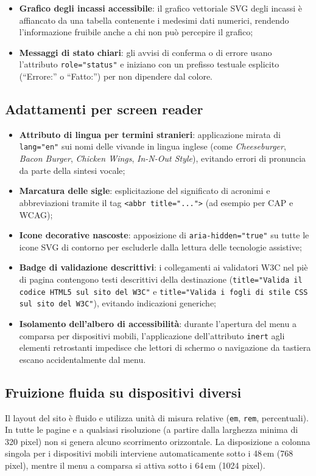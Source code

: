 \documentclass[a4paper,11pt]{article}
\begin{document}
\begin{itemize}
    \item \textbf{Grafico degli incassi accessibile}: il grafico vettoriale SVG degli incassi è affiancato da una tabella contenente i medesimi dati numerici, rendendo l'informazione fruibile anche a chi non può percepire il grafico;
    \item \textbf{Messaggi di stato chiari}: gli avvisi di conferma o di errore usano l'attributo \texttt{role="status"} e iniziano con un prefisso testuale esplicito (``Errore:'' o ``Fatto:'') per non dipendere dal colore.
\end{itemize}

\subsection{Adattamenti per screen reader}
\begin{itemize}
    \item \textbf{Attributo di lingua per termini stranieri}: applicazione mirata di \texttt{lang="en"} sui nomi delle vivande in lingua inglese (come \textit{Cheeseburger}, \textit{Bacon Burger}, \textit{Chicken Wings}, \textit{In-N-Out Style}), evitando errori di pronuncia da parte della sintesi vocale;
    \item \textbf{Marcatura delle sigle}: esplicitazione del significato di acronimi e abbreviazioni tramite il tag \texttt{<abbr title="...">} (ad esempio per CAP e WCAG);
    \item \textbf{Icone decorative nascoste}: apposizione di \texttt{aria-hidden="true"} su tutte le icone SVG di contorno per escluderle dalla lettura delle tecnologie assistive;
    \item \textbf{Badge di validazione descrittivi}: i collegamenti ai validatori W3C nel piè di pagina contengono testi descrittivi della destinazione (\texttt{title="Valida il codice HTML5 sul sito del W3C"} e \texttt{title="Valida i fogli di stile CSS sul sito del W3C"}), evitando indicazioni generiche;
    \item \textbf{Isolamento dell'albero di accessibilità}: durante l'apertura del menu a comparsa per dispositivi mobili, l'applicazione dell'attributo \texttt{inert} agli elementi retrostanti impedisce che lettori di schermo o navigazione da tastiera escano accidentalmente dal menu.
\end{itemize}

\subsection{Fruizione fluida su dispositivi diversi}
Il layout del sito è fluido e utilizza unità di misura relative (\texttt{em}, \texttt{rem}, percentuali). In tutte le pagine e a qualsiasi risoluzione (a partire dalla larghezza minima di 320 pixel) non si genera alcuno scorrimento orizzontale. La disposizione a colonna singola per i dispositivi mobili interviene automaticamente sotto i 48\,em (768 pixel), mentre il menu a comparsa si attiva sotto i 64\,em (1024 pixel).
\end{document}
